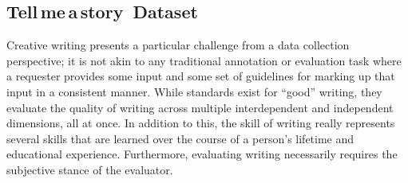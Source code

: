 \documentclass{article}
\newcommand{\tellmeastory}{{\sc Tell$\,$me$\,$a$\,$story}}
\newcommand{\reinald}[1]{{\textcolor{teal}{\bf{Reinald:} \emph{#1}}}}
\begin{document}


\subsection{\tellmeastory\ Dataset}
\label{sec:dataset}

Creative writing presents a particular challenge from a data collection perspective; it is not akin to any traditional annotation or evaluation task where a requester provides some input and some set of guidelines for marking up that input in a consistent manner.
%
%
While standards exist for “good” writing, they evaluate the quality of writing across multiple interdependent and independent dimensions, all at once. In addition to this, the skill of writing really represents several skills that are learned over the course of a person's lifetime and educational experience.
Furthermore, evaluating writing necessarily requires the subjective stance of the evaluator. %
%
%
\end{document}
